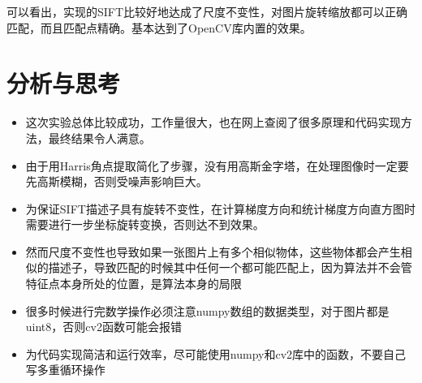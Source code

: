 \documentclass[12pt,a4paper]{article}
\begin{document}
\begin{figure}[H]

	


\end{figure}

可以看出，实现的SIFT比较好地达成了尺度不变性，对图片旋转缩放都可以正确匹配，而且匹配点精确。基本达到了OpenCV库内置的效果。





\section{分析与思考}
\begin{itemize}
\item 这次实验总体比较成功，工作量很大，也在网上查阅了很多原理和代码实现方法，最终结果令人满意。
\item 由于用Harris角点提取简化了步骤，没有用高斯金字塔，在处理图像时一定要先高斯模糊，否则受噪声影响巨大。
\item 为保证SIFT描述子具有旋转不变性，在计算梯度方向和统计梯度方向直方图时需要进行一步坐标旋转变换，否则达不到效果。
\item 然而尺度不变性也导致如果一张图片上有多个相似物体，这些物体都会产生相似的描述子，导致匹配的时候其中任何一个都可能匹配上，因为算法并不会管特征点本身所处的位置，是算法本身的局限
\item 很多时候进行完数学操作必须注意numpy数组的数据类型，对于图片都是uint8，否则cv2函数可能会报错
\item 为代码实现简洁和运行效率，尽可能使用numpy和cv2库中的函数，不要自己写多重循环操作
\newpage
\end{itemize}
\end{document}
